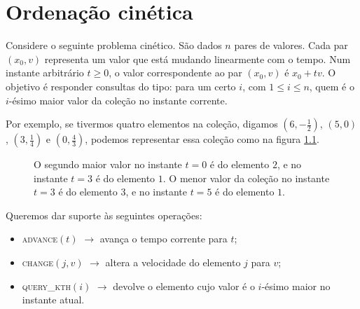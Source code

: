 
\chapter{Ordenação cinética}
Considere o seguinte problema cinético. São dados $n$ pares de
valores. Cada par $(x_0, v)$ representa um valor que está mudando
linearmente com o tempo. Num instante arbitrário $t \geq 0$, o valor
correspondente ao par $(x_0, v)$ é $x_0 + tv$. O objetivo é
responder consultas do tipo: para um certo $i$, com $1 \leq i \leq
n$, quem é o $i$-ésimo maior valor da coleção no instante corrente.

Por exemplo, se tivermos quatro elementos na coleção, digamos
$\left(6, -\frac{1}{2}\right)$, $(5, 0)$, $\left(3,
\frac{1}{4}\right)$ e $\left(0, \frac{4}{3}\right)$, podemos
representar essa coleção como na figura \ref{fig:ordenacao:exemplo}.

\begin{figure}[H]
    \centering
    
    \caption[Exemplo ordenação cinética]{O segundo maior valor no
            instante $t = 0$ é do elemento $2$, e no instante $t =
            3$ é do elemento $1$. O menor valor da coleção no
            instante $t = 3$ é do elemento $3$, e no instante $t =
            5$ é do elemento $1$.}
    \label{fig:ordenacao:exemplo}
\end{figure}

Queremos dar suporte às seguintes operações:
\begin{itemize}
    \item \textsc{advance}$(t)$ $\rightarrow$ avança o tempo
    corrente para $t$;
    \item \textsc{change}$(j, v)$ $\rightarrow$ altera a
    velocidade do elemento $j$ para $v$;
    \item \textsc{query\_kth}$(i)$ $\rightarrow$ devolve o
    elemento cujo valor é o $i$-ésimo maior no instante atual.
\end{itemize}